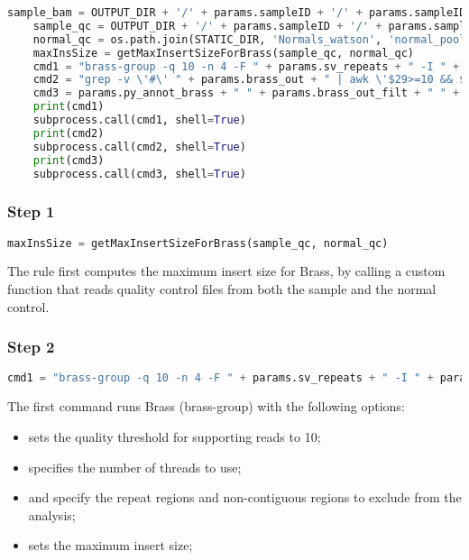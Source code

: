 \begin{lstlisting}[breaklines=true, language=python]
    sample_bam = OUTPUT_DIR + '/' + params.sampleID + '/' + params.sampleID + '_clip.bam'
    sample_qc = OUTPUT_DIR + '/' + params.sampleID + '/' + params.sampleID + '_qc.tsv'
    normal_qc = os.path.join(STATIC_DIR, 'Normals_watson', 'normal_pool_qc.txt')
    maxInsSize = getMaxInsertSizeForBrass(sample_qc, normal_qc)
    cmd1 = "brass-group -q 10 -n 4 -F " + params.sv_repeats + " -I " + params.sv_noncontigs + " -m " + str(maxInsSize) + " " + sample_bam + " " + params.normal_bam + " >" + params.brass_out
    cmd2 = "grep -v \'#\' " + params.brass_out + " | awk \'$29>=10 && $9+$10+$11+$12+$13+$14+$15+$16+$17+$18+$19+$20+$21+$22+$23+$24+$25+$26+$27+$28==0 {print $0}\' >" + params.brass_out_filt
    cmd3 = params.py_annot_brass + " " + params.brass_out_filt + " " + params.gene_footprints + " " + output.brass_final
    print(cmd1)
    subprocess.call(cmd1, shell=True)
    print(cmd2)
    subprocess.call(cmd2, shell=True)
    print(cmd3)
    subprocess.call(cmd3, shell=True)
\end{lstlisting}

\subsubsection*{Step 1}

\begin{lstlisting}[breaklines=true, language=python]
    maxInsSize = getMaxInsertSizeForBrass(sample_qc, normal_qc)
\end{lstlisting}

The rule first computes the maximum insert size for Brass, by calling a custom function that reads quality control files from both the sample and the normal control.

\subsubsection*{Step 2}

\begin{lstlisting}[breaklines=true, language=python]
    cmd1 = "brass-group -q 10 -n 4 -F " + params.sv_repeats + " -I " + params.sv_noncontigs + " -m " + str(maxInsSize) + " " + sample_bam + " " + params.normal_bam + " >" + params.brass_out
\end{lstlisting}

The first command runs Brass (brass-group) with the following options:
\begin{itemize}
    \item {} sets the quality threshold for supporting reads to 10;
    \item {} specifies the number of threads to use;
    \item {} and  specify the repeat regions and non-contiguous regions to exclude from the analysis;
    \item {} sets the maximum insert size;
\end{itemize}

